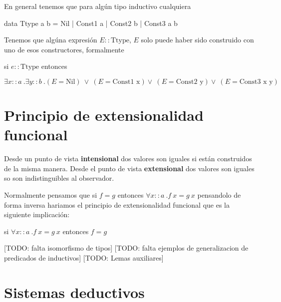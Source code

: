 \documentclass{article}
\begin{document}
En general tenemos que para algún tipo inductivo cualquiera
\begin{haskcode}
data Ttype a b = Nil | Const1 a | Const2 b | Const3 a b
\end{haskcode}
Tenemos que algúna expresión $E :: \text{Ttype}$, $E$ solo puede haber sido construido con uno de esos constructores, formalmente

si $e :: \text{Ttype}$ entonces

$\exists x :: a\ .\exists y :: b\ . (E = \text{Nil})\ \lor\ (E = \text{Const1 x}) \lor\ (E = \text{Const2 y}) \lor\ (E = \text{Const3 x y})$

\section{Principio de extensionalidad funcional}
Desde un punto de vista \textbf{intensional} dos valores son iguales si están construidos de la misma manera. Desde el punto de vista \textbf{extensional} dos valores son iguales so son indistinguibles al observador.

Normalmente pensamos que si $f = g$ entonces $\forall x :: a\ .f\ x = g\ x$ pensandolo de forma inversa hariamos el principio de extensionalidad funcional que es la siguiente implicación:

si $\forall x :: a\ .f\ x = g\ x$ entonces $f = g$

[TODO: falta isomorfismo de tipos]
[TODO: falta ejemplos de generalizacion de predicados de inductivos]
[TODO: Lemas auxiliares]

\section{Sistemas deductivos}
\end{document}
